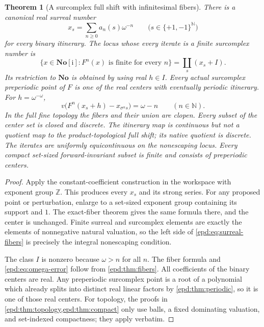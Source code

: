 \documentclass[11pt,a4paper]{article}
\numberwithin{equation}{section}
\newtheorem{theorem}{Theorem}[section]
\theoremstyle{plain}
\theoremstyle{definition}
\theoremstyle{remark}
\newcommand{\No}{\mathbf{No}}
\newcommand{\SC}{\No[\mathrm i]}
\newcommand{\Z}{\mathbb Z}
\newcommand{\N}{\mathbb N}
\newcommand{\sh}{\sigma}
\begin{document}
\begin{theorem}[A surcomplex full shift with infinitesimal fibers]
\label{epd:thm:surreal}
There is a canonical real surreal number
\[
 x_s=\sum_{n\geq0}a_n(s)\omega^{-n}
 \qquad\bigl(s\in\{+1,-1\}^{\N}\bigr)
\]
for every binary itinerary. The locus whose every iterate is a finite surcomplex number is
\begin{equation}\label{epd:eq:surreal-fibers}
 \{x\in\SC:F^n(x)\text{ is finite for every }n\}
   =\coprod_s(x_s+I).
\end{equation}
Its restriction to $\No$ is obtained by using real $h\in I$.
Every actual surcomplex preperiodic point of $F$ is one of the real
centers with eventually periodic itinerary. For $h=\omega^{-\omega}$,
\begin{equation}\label{epd:eq:omega-error}
 v\bigl(F^n(x_s+h)-x_{\sh^n s}\bigr)=\omega-n
 \qquad(n\in\N).
\end{equation}
In the full fine topology the fibers and their union are clopen.
Every subset of the center set is closed and discrete. The itinerary map
is continuous but not a quotient map to the product-topological full shift;
its native quotient is discrete. The iterates are uniformly equicontinuous
on the nonescaping locus. Every compact set-sized forward-invariant subset
is finite and consists of preperiodic centers.
\end{theorem}
\begin{proof}
Apply the constant-coefficient construction in the workspace with
exponent group $\Z$. This produces every $x_s$ and its strong series.
For any proposed point or perturbation, enlarge to a set-sized exponent
group containing its support and $1$. The exact-fiber theorem gives
the same formula there, and the center is unchanged. Finite surreal
and surcomplex elements are exactly the elements of nonnegative
natural valuation, so the left side of \eqref{epd:eq:surreal-fibers} is
precisely the integral nonescaping condition.

The class $I$ is nonzero because $\omega>n$ for all $n$. The fiber
formula and \eqref{epd:eq:omega-error} follow from
\cref{epd:thm:fibers}. All coefficients of the binary centers are real.
Any preperiodic surcomplex point is a root of a polynomial which already
splits into distinct real linear factors by \cref{epd:thm:periodic}, so it
is one of those real centers. For topology, the proofs in
\cref{epd:thm:topology,epd:thm:compact} only use balls, a fixed dominating
valuation, and set-indexed compactness; they apply verbatim.
\end{proof}
\end{document}
